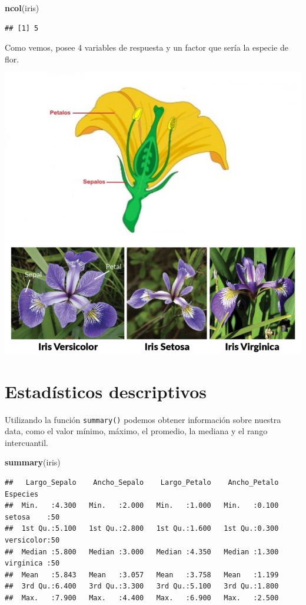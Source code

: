 \documentclass[
]{book}
\newenvironment{Shaded}{\begin{snugshade}}{\end{snugshade}}
\newcommand{\FunctionTok}[1]{\textcolor[rgb]{0.13,0.29,0.53}{\textbf{#1}}}
\newcommand{\NormalTok}[1]{#1}
\begin{document}
\begin{Shaded}
\begin{Highlighting}[]
\FunctionTok{ncol}\NormalTok{(iris)}
\end{Highlighting}
\end{Shaded}

\begin{verbatim}
## [1] 5
\end{verbatim}

Como vemos, posee 4 variables de respuesta y un factor que sería la especie de flor.

\includegraphics[width=0.5\linewidth]{images//flores}
\includegraphics[width=0.5\linewidth]{images//flores2}

\section{Estadísticos descriptivos}\label{estaduxedsticos-descriptivos}

Utilizando la función \texttt{summary()} podemos obtener información sobre nuestra data, como el valor mínimo, máximo, el promedio, la mediana y el rango intercuantil.

\begin{Shaded}
\begin{Highlighting}[]
\FunctionTok{summary}\NormalTok{(iris)}
\end{Highlighting}
\end{Shaded}

\begin{verbatim}
##   Largo_Sepalo    Ancho_Sepalo    Largo_Petalo    Ancho_Petalo         Especies 
##  Min.   :4.300   Min.   :2.000   Min.   :1.000   Min.   :0.100   setosa    :50  
##  1st Qu.:5.100   1st Qu.:2.800   1st Qu.:1.600   1st Qu.:0.300   versicolor:50  
##  Median :5.800   Median :3.000   Median :4.350   Median :1.300   virginica :50  
##  Mean   :5.843   Mean   :3.057   Mean   :3.758   Mean   :1.199                  
##  3rd Qu.:6.400   3rd Qu.:3.300   3rd Qu.:5.100   3rd Qu.:1.800                  
##  Max.   :7.900   Max.   :4.400   Max.   :6.900   Max.   :2.500
\end{verbatim}
\end{document}

